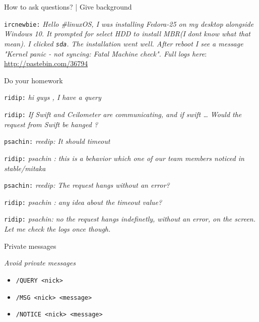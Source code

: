 \documentclass[10pt]{beamer}
\begin{document}
\begin{frame}[fragile,label={sec:org0fecfbc}]{How to ask questions? | Give background}
 \begin{block}{}
\texttt{ircnewbie:} \emph{Hello \#linuxOS, I was installing Fedora-25 on my desktop}
\emph{alongside Windows 10. It prompted for select HDD to install MBR(I}
\emph{dont know what that mean). I clicked \texttt{sda}. The installation went well. After}
\emph{reboot I see a message "Kernel panic - not syncing: Fatal Machine}
\emph{check". Full logs here}: \url{http://pastebin.com/36794}
\end{block}
\end{frame}

\begin{frame}[fragile,label={sec:orgd865bef}]{Do your homework}
 \begin{block}{}
\texttt{ridip:} \emph{hi guys , I have a query}

\texttt{ridip:}  \emph{If Swift and Ceilometer are communicating, and if
swift \ldots{} Would the request from Swift be hanged ?}

\texttt{psachin:}  \emph{reedip: It should timeout}

\texttt{ridip:}  \emph{psachin : this is a behavior which one of our team
members noticed in stable/mitaka}

\texttt{psachin:} \emph{reedip: The request hangs without an error?}

\texttt{ridip:} \emph{psachin : any idea about the timeout value?}

\texttt{ridip:} \emph{psachin: no the request hangs indefinetly, without an error, on the screen. Let me check the logs once though.}
\end{block}
\end{frame}

\begin{frame}[fragile,label={sec:orge2c4590}]{Private messages}
 \begin{block}{}
\centering \emph{Avoid private messages}
\end{block}

\begin{block}{}
\begin{itemize}
\item \texttt{/QUERY <nick>}

\item \texttt{/MSG <nick> <message>}

\item \texttt{/NOTICE <nick> <message>}
\end{itemize}
\end{block}
\end{frame}
\end{document}
